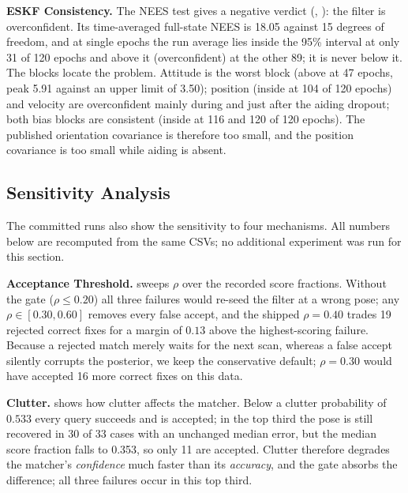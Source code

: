 


\noindent\textbf{ESKF Consistency.} The NEES test gives a negative verdict (, ): the filter is overconfident. Its time-averaged full-state NEES is 18.05 against 15 degrees of freedom, and at single epochs the run average lies inside the 95\% interval at only 31 of 120 epochs and above it (overconfident) at the other 89; it is never below it. The blocks locate the problem. Attitude is the worst block (above at 47 epochs, peak 5.91 against an upper limit of 3.50); position (inside at 104 of 120 epochs) and velocity are overconfident mainly during and just after the aiding dropout; both bias blocks are consistent (inside at 116 and 120 of 120 epochs). The published orientation covariance is therefore too small, and the position covariance is too small while aiding is absent.

\subsection{Sensitivity Analysis}\label{sec:ablation}

The committed runs also show the sensitivity to four mechanisms. All numbers below are recomputed from the same CSVs; no additional experiment was run for this section.



\noindent\textbf{Acceptance Threshold.}  sweeps $\rho$ over the recorded score fractions. Without the gate ($\rho\le0.20$) all three failures would re-seed the filter at a wrong pose; any $\rho\in[0.30,0.60]$ removes every false accept, and the shipped $\rho=0.40$ trades 19 rejected correct fixes for a margin of $0.13$ above the highest-scoring failure. Because a rejected match merely waits for the next scan, whereas a false accept silently corrupts the posterior, we keep the conservative default; $\rho=0.30$ would have accepted 16 more correct fixes on this data.



\noindent\textbf{Clutter.}  shows how clutter affects the matcher. Below a clutter probability of $0.533$ every query succeeds and is accepted; in the top third the pose is still recovered in 30 of 33 cases with an unchanged median error, but the median score fraction falls to 0.353, so only 11 are accepted. Clutter therefore degrades the matcher's \emph{confidence} much faster than its \emph{accuracy}, and the gate absorbs the difference; all three failures occur in this top third.

